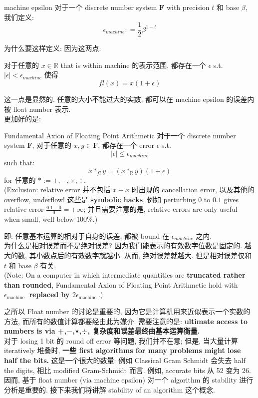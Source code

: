 \documentclass[lang=cn,11pt]{elegantbook}
\begin{document}
\begin{definition}{machine epsilon}
对于一个 discrete number system $\mathbf{F}$ with precision $t$ 和 base $\beta$,  我们定义: \[
    \epsilon_{machine}  : = \frac{1}{2} \beta^{1-t}
    \]
\end{definition}
为什么要这样定义: 因为这两点:
\begin{proposition}
    对于任意的 $x\in \mathbb{R}$ that is within machine 的表示范围, 都存在一个 $\epsilon$ s.t. $|\epsilon| < \epsilon_{machine}$ 使得 \[
    fl(x) = x(1+ \epsilon)
    \]
\end{proposition}
这一点是显然的. 任意的大小不能过大的实数, 都可以在 machine epsilon 的误差内被 float number 表示.\\
更加好的是:
\begin{theorem}{Fundamental Axion of Floating Point Arithmetic}
  对于一个 discrete number system $\mathbf{F}$, 对于任意的 $x,y\in \mathbf{F}$, 都存在一个 error $\epsilon$ s.t. \[
  |\epsilon| \leq \epsilon_{machine}
  \]such that:  $$
x *_{fl} y=(x *_{\mathbb{R}} y)(1+\epsilon)
$$
for 任意的 $* := +,-,\times ,\div$.\\
(Exclusion: relative error 并不包括 $x-x$ 时出现的 cancellation error, 以及其他的 overflow, underflow! 这些是\textbf{ symbolic hacks}, 例如 perturbing $0$ to $0.1$ gives relative error $\frac{0.1-0}{0}=+\infty$; 并且需要注意的是, relative errors are only useful when small, well below $100 \%$.)
\end{theorem}
即: 任意基本运算的相对于自身的误差, 都被 bound 在 $\epsilon_{machine}$ 之内.\\
为什么是相对误差而不是绝对误差? 因为我们能表示的有效数字位数是固定的. 越大的数, 其小数点后的有效数字就越小. 从而, 绝对误差就越大. 但是相对误差仅和 $t$ 和 base $\beta$ 有关.\\
(Note: On a computer in which intermediate quantities are \textbf{truncated rather than rounded}, Fundamental Axion of Floating Point Arithmetic hold with\textbf{ $\epsilon_{\text {machine }}$ replaced by $2 \epsilon_{\text {machine }}$}.)\\

\begin{remark}
之所以 Float number 的讨论是重要的, 因为它是计算机用来近似表示一个实数的方法, 而所有的数值计算都要经由此为媒介. 需要注意的是:\textbf{ ultimate access to numbers is via +,−,⋆,÷, 复杂度和误差最终由基本运算衡量.}\\

对于 losing 1 bit  的 round off error 等问题, 我们并不在意; 但是, 当大量计算 iteratively 堆叠时, \textbf{一些 first algorithms for many problems might lose half the bits. } 这是一个很大的数量: 例如 Classical Gram 
Schmidt 会失去 half the digits, 相比 modified Gram-Schmidt 而言. 例如, accurate bits 从 52 变为 26.\\

因而, 基于 float number (via machine epsilon) 对一个 algorithm 的 stability 进行分析是重要的. 接下来我们将讲解 stability of an algorithm 这个概念.
\end{remark}
\end{document}
